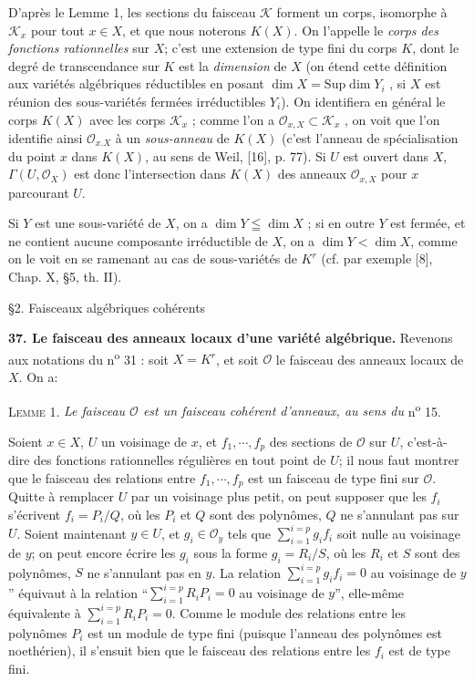 D'après le Lemme 1, les sections du faisceau $\mathcal{K}$ forment un corps, isomorphe à $\mathcal{K}_x$ pour tout $x \in X$, et que nous noterons $K(X)$. On l'appelle le \textit{corps des fonctions rationnelles} sur $X$; c'est une extension de type fini du corps $K$, dont le degré de transcendance sur $K$ est la \textit{dimension} de $X$ (on étend cette définition aux variétés algébriques réductibles en posant $\dim X = \mathrm{Sup} \dim Y_i$ , si $X$ est réunion des sous-variétés fermées irréductibles $Y_i$). On identifiera en général le corps $K(X)$ avec les corps $\mathcal{K}_x$ ; comme l'on a $\mathcal{O}_{x,X} \subset \mathcal{K}_x$ , on voit que l'on identifie ainsi $\mathcal{O}_{x.X}$ à un \textit{sous-anneau} de $K(X)$ (c'est l'anneau de spécialisation du point $x$ dans $K(X)$, au sens de Weil, [16], p. 77). Si $U$ est ouvert dans $X$, $\Gamma(U, \mathcal{O}_X)$ est donc l'intersection dans $K(X)$ des anneaux $\mathcal{O}_{x,X}$ pour $x$ parcourant $U$.

Si $Y$ est une sous-variété de $X$, on a $\dim Y \leqq \dim X$ ; si en outre $Y$ est fermée, et ne contient aucune composante irréductible de $X$, on a $\dim Y < \dim X$, comme on le voit en se ramenant au cas de sous-variétés de $K^r$ (cf. par exemple [8], Chap. X, \S5, th. II).


\S2. Faisceaux algébriques cohérents

\textbf{37. Le faisceau des anneaux locaux d'une variété algébrique.} Revenons aux notations du n\textsuperscript{o} 31 : soit $X = K^r$, et soit $\mathcal{O}$ le faisceau des anneaux locaux de $X$. On a:

\textsc{Lemme} 1. \textit{Le faisceau $\mathcal{O}$ est un faisceau cohérent d'anneaux, au sens du} n\textsuperscript{o} 15.

Soient $x \in X$, $U$ un voisinage de $x$, et $f_1 , \cdots , f_p$ des sections de $\mathcal{O}$ sur $U$, c'est-à-dire des fonctions rationnelles régulières en tout point de $U$; il nous faut montrer que le faisceau des relations entre $f_1 , \cdots , f_p$ est un faisceau de type fini sur $\mathcal{O}$. Quitte à remplacer $U$ par un voisinage plus petit, on peut supposer que les $f_i$ s'écrivent $f_i = P_i/Q$, où les $P_i$ et $Q$ sont des polynômes, $Q$ ne s'annulant pas sur $U$. Soient maintenant $y \in U$, et $g_i \in \mathcal{O}_y$ tels que $\sum_{i=1}^{i=p} g_i f_i$ soit nulle au voisinage de $y$; on peut encore écrire les $g_i$ sous la forme $g_i = R_i/S$, où les $R_i$ et $S$ sont des polynômes, $S$ ne s'annulant pas en $y$. La relation $\sum_{i=1}^{i=p} g_i f_i = 0$ au voisinage de $y$'' équivaut à la relation ``$\sum_{i=1}^{i=p} R_i P_i = 0$ au voisinage de $y$'', elle-même équivalente à $\sum_{i=1}^{i=p} R_i P_i = 0$. Comme le module des relations entre les polynômes $P_i$ est un module de type fini (puisque l'anneau des polynômes est noethérien), il s'ensuit bien que le faisceau des relations entre les $f_i$ est de type fini.

